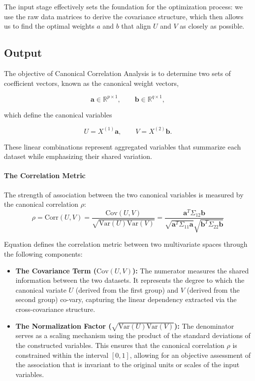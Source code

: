 The input stage effectively sets the foundation for the optimization process: we use the raw data matrices to derive the covariance structure, which then allows us to find the optimal weights $a$ and $b$ that align $U$ and $V$ as closely as possible.


\subsection{Output}

The objective of Canonical Correlation Analysis is to determine two sets of coefficient vectors, known as the canonical weight vectors,

\begin{equation*}
\mathbf{a} \in \mathbb{R}^{p \times 1}, \qquad 
\mathbf{b} \in \mathbb{R}^{q \times 1},
\end{equation*}

which define the canonical variables

\begin{equation*}
U = X^{(1)}\mathbf{a}, \qquad 
V = X^{(2)}\mathbf{b}.
\end{equation*}

These linear combinations represent aggregated variables that summarize each dataset while emphasizing their shared variation.


\paragraph{The Correlation Metric}
The strength of association between the two canonical variables is measured by the canonical correlation $\rho$:
\begin{equation}
\rho = \text{Corr}(U,V) = \frac{\text{Cov}(U,V)}{\sqrt{\text{Var}(U)\text{Var}(V)}} = \frac{\mathbf{a}^T \Sigma_{12} \mathbf{b}}{\sqrt{\mathbf{a}^T \Sigma_{11} \mathbf{a}} \sqrt{\mathbf{b}^T \Sigma_{22} \mathbf{b}}}
\end{equation}

Equation defines the correlation metric between two multivariate spaces through the following components:
\begin{itemize}
    \item \textbf{The Covariance Term ($\text{Cov}(U,V)$):} The numerator measures the shared information between the two datasets. It represents the degree to which the canonical variate $U$ (derived from the first group) and $V$ (derived from the second group) co-vary, capturing the linear dependency extracted via the cross-covariance structure.

    \item \textbf{The Normalization Factor ($\sqrt{\text{Var}(U)\text{Var}(V)}$):} The denominator serves as a scaling mechanism using the product of the standard deviations of the constructed variables. This ensures that the canonical correlation $\rho$ is constrained within the interval $[0, 1]$, allowing for an objective assessment of the association that is invariant to the original units or scales of the input variables.
\end{itemize}

